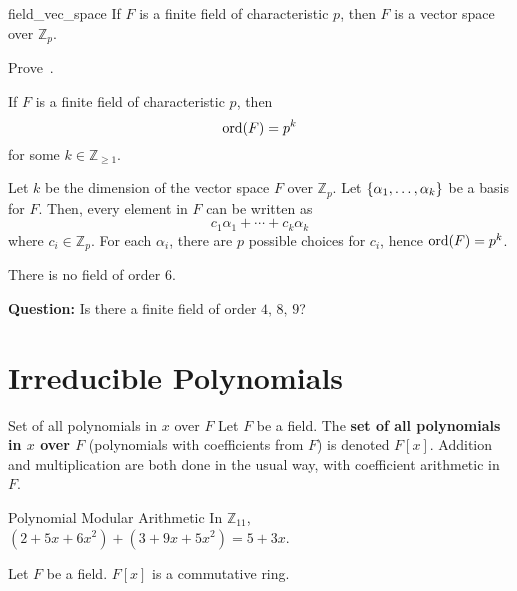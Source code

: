 \begin{Theorem}{}{field_vec_space}
    If $ F $ is a finite field of characteristic $ p $, then $ F $
    is a vector space over $ \mathbb{Z}_p $.
\end{Theorem}

\begin{Exercise}{}{}
    Prove~.
\end{Exercise}

\begin{Theorem}{}{}
    If $ F $ is a finite field of characteristic $ p $, then
    \[ \operatorname{ord}(F)=p^k \]
    for some $ k\in\mathbb{Z}_{\geqslant 1} $.
\end{Theorem}

\begin{Proof}{}{}
    Let $ k $ be the dimension of the vector space $ F $ over $ \mathbb{Z}_p $.
    Let $ \{\alpha_1,\ldots ,\alpha_k\} $ be a basis for $ F $. Then, every element
    in $ F $ can be written as
    \[ c_1\alpha_1+\cdots+c_k\alpha_k \]
    where $ c_i\in\mathbb{Z}_p $. For each $ \alpha_i $, there are $ p $
    possible choices for $ c_i $, hence $ \operatorname{ord}(F)=p^k $.
\end{Proof}

\begin{Example}{}{}
    There is no field of order $ 6 $.
\end{Example}

\textbf{Question:} Is there a finite field of order $ 4,\,8,\,9 $?

\section{Irreducible Polynomials}

\begin{Definition}{Set of all polynomials in $ x $ over $ F $}{}
    Let $ F $ be a field. The \textbf{set of all polynomials in $ x $ over $ F $}
    (polynomials with coefficients from $ F $) is denoted $ F[x] $. Addition
    and multiplication are both done in the usual way, with coefficient arithmetic
    in $ F $.
\end{Definition}

\begin{Example}{Polynomial Modular Arithmetic}{}
    In $ \mathbb{Z}_{11} $, $ (2+5x+6x^2)+(3+9x+5x^2)=5+3x $.
\end{Example}

\begin{Theorem}{}{}
    Let $ F $ be a field. $ F[x] $ is a commutative ring.
\end{Theorem}

